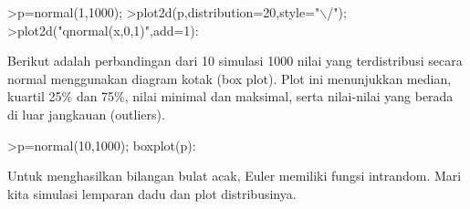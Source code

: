\documentclass[12pt,arial,letterpaper]{book}
\begin{document}
\begin{eulercomment}
\begin{eulercomment}
\begin{eulercomment}
\begin{eulercomment}
\begin{eulercomment}
\begin{eulercomment}
\begin{eulercomment}
\begin{eulercomment}
\begin{eulercomment}
\begin{eulercomment}
\begin{eulercomment}
\begin{eulercomment}
\begin{eulercomment}
\begin{eulercomment}
\begin{eulercomment}
\begin{eulercomment}
\begin{eulercomment}
\begin{eulercomment}
\begin{eulercomment}
\begin{eulercomment}
\begin{eulercomment}
\begin{eulercomment}
\begin{eulercomment}
\begin{eulercomment}
\begin{eulercomment}
\begin{eulercomment}
\begin{eulercomment}
\begin{eulercomment}
\begin{eulercomment}
\begin{eulercomment}
\begin{eulercomment}
\begin{eulercomment}
\begin{eulercomment}
\end{eulercomment}
\begin{eulerprompt}
>p=normal(1,1000); 
>plot2d(p,distribution=20,style="\(\backslash\)/"); 
>plot2d("qnormal(x,0,1)",add=1): 
\end{eulerprompt}
\begin{eulercomment}
Berikut adalah perbandingan dari 10 simulasi 1000 nilai yang
terdistribusi secara normal menggunakan diagram kotak (box plot). Plot
ini menunjukkan median, kuartil 25\% dan 75\%, nilai minimal dan
maksimal, serta nilai-nilai yang berada di luar jangkauan (outliers).
\end{eulercomment}
\begin{eulerprompt}
>p=normal(10,1000); boxplot(p):
\end{eulerprompt}
\begin{eulercomment}
Untuk menghasilkan bilangan bulat acak, Euler memiliki fungsi
intrandom. Mari kita simulasi lemparan dadu dan plot distribusinya.


\end{eulercomment}
\end{eulercomment}
\end{eulercomment}
\end{eulercomment}
\end{eulercomment}
\end{eulercomment}
\end{eulercomment}
\end{eulercomment}
\end{eulercomment}
\end{eulercomment}
\end{eulercomment}
\end{eulercomment}
\end{eulercomment}
\end{eulercomment}
\end{eulercomment}
\end{eulercomment}
\end{eulercomment}
\end{eulercomment}
\end{eulercomment}
\end{eulercomment}
\end{eulercomment}
\end{eulercomment}
\end{eulercomment}
\end{eulercomment}
\end{eulercomment}
\end{eulercomment}
\end{eulercomment}
\end{eulercomment}
\end{eulercomment}
\end{eulercomment}
\end{eulercomment}
\end{eulercomment}
\end{eulercomment}
\end{document}
